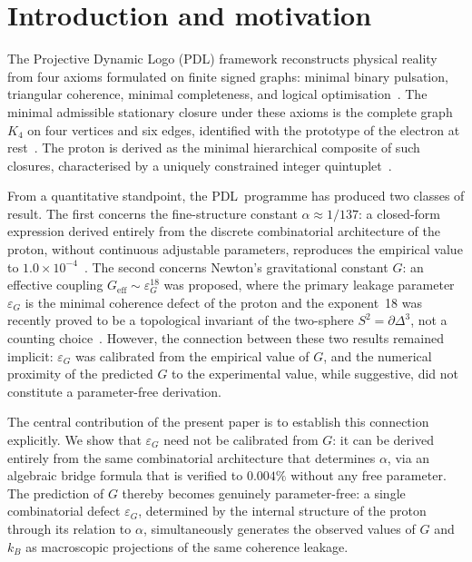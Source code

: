 \documentclass[11pt,a4paper]{article}
\theoremstyle{definition}
\newcommand{\PDL}{\textnormal{PDL}}
\newcommand{\epsg}{\varepsilon_G}
\begin{document}
\newpage

\tableofcontents

\section{Introduction and motivation}
\label{sec:intro}

The Projective Dynamic Logo (\PDL) framework reconstructs physical reality from four axioms formulated on finite signed graphs: minimal binary pulsation, triangular coherence, minimal completeness, and logical optimisation~\cite{PDL_Main_2026,PDL_Intro_2026}. The minimal admissible stationary closure under these axioms is the complete graph $K_4$ on four vertices and six edges, identified with the prototype of the electron at rest~\cite{PDL_Main_2026,Minimal_Stationary_Closures_2026}. The proton is derived as the minimal hierarchical composite of such closures, characterised by a uniquely constrained integer quintuplet~\cite{Combinatorial_Proton_v2_2026}.

From a quantitative standpoint, the \PDL\ programme has produced two classes of result. The first concerns the fine-structure constant $\alpha \approx 1/137$: a closed-form expression derived entirely from the discrete combinatorial architecture of the proton, without continuous adjustable parameters, reproduces the empirical value to $1.0 \times 10^{-4}$~\cite{Alpha_PDL_v2_2026,Golden_Ratio_PDL_2026}. The second concerns Newton's gravitational constant $G$: an effective coupling $G_{\mathrm{eff}} \sim \epsg^{18}$ was proposed, where the primary leakage parameter $\epsg$ is the minimal coherence defect of the proton and the exponent~18 was recently proved to be a topological invariant of the two-sphere $S^2 = \partial\Delta^3$, not a counting choice~\cite{Exponent_18_PDL_2026,Topology_18_PDL_2026}. However, the connection between these two results remained implicit: $\epsg$ was calibrated from the empirical value of $G$, and the numerical proximity of the predicted $G$ to the experimental value, while suggestive, did not constitute a parameter-free derivation.

The central contribution of the present paper is to establish this connection explicitly. We show that $\epsg$ need not be calibrated from $G$: it can be derived entirely from the same combinatorial architecture that determines $\alpha$, via an algebraic bridge formula that is verified to $0.004\%$ without any free parameter. The prediction of $G$ thereby becomes genuinely parameter-free: a single combinatorial defect $\epsg$, determined by the internal structure of the proton through its relation to $\alpha$, simultaneously generates the observed values of $G$ and $k_B$ as macroscopic projections of the same coherence leakage.
\end{document}

